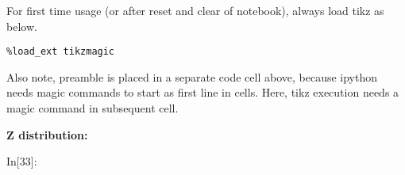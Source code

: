 \documentclass[float=false,crop=false]{standalone}
\begin{document}
For first time usage (or after reset and clear of notebook), always load
tikz as below.

\begin{verbatim}
%load_ext tikzmagic
\end{verbatim}

Also note, preamble is placed in a separate code cell above, because
ipython needs magic commands to start as first line in cells. Here, tikz
execution needs a magic command in subsequent cell.

\textbf{Z distribution:}
\begin{InVerbatim}[commandchars=\\\{\},fontsize=\scriptsize]
{\color{incolor}In[{\color{incolor}33}]:}   
\end{InVerbatim}
    
\end{document}
